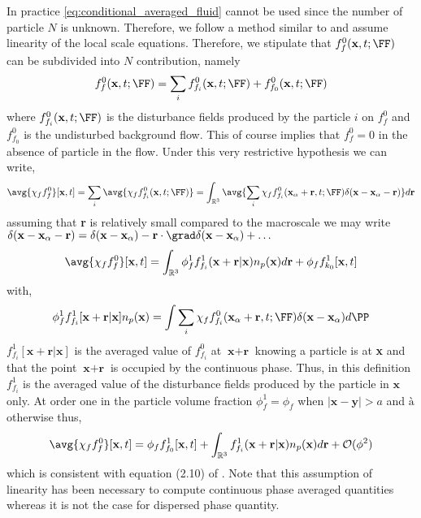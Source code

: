 In practice \ref{eq:conditional_averaged_fluid} cannot be used since the number of particle $N$ is unknown. 
Therefore, we follow a method similar to \citet{batchelor1972sedimentation} and assume linearity of the local scale equations. 
Therefore, we stipulate that $f_f^0(\textbf{x},t;\FF)$ can be subdivided into $N$ contribution, namely  
\begin{equation}
    f_f^0(\textbf{x},t;\FF)
    = 
    \sum_i
    f_{f_i}^0(\textbf{x},t;\FF)
    + f_{f_0}^0(\textbf{x},t;\FF)
\end{equation}
where $f_{f_i}^0(\textbf{x},t;\FF)$ is the disturbance fields produced by the particle $i$ on $f_f^0$ and $f_{f_0}^0$ is the undisturbed background flow. 
This of course implies that $f_f^0 = 0$ in the absence of particle in the flow. 
Under this very restrictive hypothesis we can write, 
\begin{equation}
    \avg{\chi_ff_f^0}[\textbf{x},t]
    = 
    \sum_i
    \avg{\chi_f f_{f_i}^0(\textbf{x},t;\FF)}
    = 
    \int_{\mathbb{R}^3} 
    \avg{
        \sum_i
    \chi_f f_{f_i}^0(\textbf{x}_\alpha + \textbf{r},t;\FF) \delta(\textbf{x} - \textbf{x}_\alpha - \textbf{r})}d\textbf{r}
\end{equation}
assuming that \textbf{r} is relatively small compared to the macroscale we may write $\delta(\textbf{x} - \textbf{x}_\alpha - \textbf{r}) =\delta(\textbf{x} - \textbf{x}_\alpha) - \textbf{r}\cdot \grad\delta(\textbf{x} - \textbf{x}_\alpha)+ \ldots$
\begin{equation}
    \avg{\chi_ff_f^0}[\textbf{x},t]
    = 
    \int_{\mathbb{R}^3} 
    \phi_f^1
    f_{f_i}^1(\textbf{x}+ \textbf{r}| \textbf{x})
    n_p(\textbf{x}) 
    d\textbf{r}
    +
    \phi_f f_{k_0}^1[\textbf{x},t]  
\end{equation}
with, 
\begin{equation*}
    \phi_f^1 f_{f_i}^1[\textbf{x}+ \textbf{r}| \textbf{x}]n_p(\textbf{x}) 
    = 
    \int{
    \sum_i
    \chi_f f_{f_i}^0(\textbf{x}_\alpha + \textbf{r},t;\FF) \delta(\textbf{x} - \textbf{x}_\alpha)
    }d\PP
\end{equation*}
$f_{f_i}^1[\textbf{x}+ \textbf{r}| \textbf{x}]$ is the averaged value of $f_{f_i}^0$ at $\textbf{x}+\textbf{r}$ knowing a particle is at \textbf{x} and that the point $\textbf{x}+\textbf{r}$ is occupied by the continuous phase. 
Thus, in this definition $f_{f_i}^1$ is the averaged value of the disturbance fields produced by the particle in $\textbf{x}$ only.
At order one in the particle volume fraction $\phi_f^1 = \phi_f$ when $|\textbf{x}-\textbf{y}|>a$ and $à$ otherwise thus, 
\begin{equation}
    \avg{\chi_f f_f^0}[\textbf{x},t]
    = 
    \phi_f f_{f_0}^1[\textbf{x},t]  
    + 
    \int_{\mathbb{R}^3} 
    f_{f_i}^1(\textbf{x}+ \textbf{r}| \textbf{x})
    n_p(\textbf{x}) 
    d\textbf{r}
    + \mathcal{O}({\phi^2})
\end{equation}
which is consistent with equation (2.10) of \citet{batchelor1972sedimentation}. 
Note that this assumption of linearity has been necessary to compute continuous phase averaged quantities whereas it is not the case for dispersed phase quantity. 

